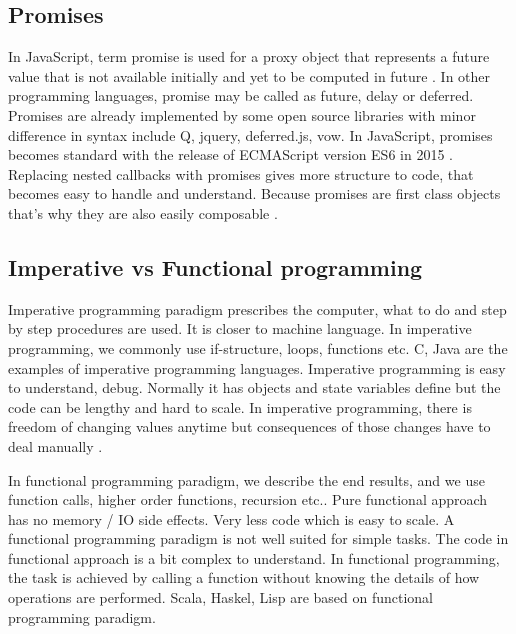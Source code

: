 \subsection{Promises}
In JavaScript, term promise is used for a proxy object that represents a future value that is not available initially and yet to be computed in future \citep{Kambona:2013:ERP:2489798.2489802}.  In other programming languages, promise may be called as future, delay or deferred. Promises are already implemented by some open source libraries with minor difference in syntax include Q, jquery, deferred.js, vow. In JavaScript, promises becomes standard with the release of ECMAScript version ES6 in 2015 \citep{ecmaScriptPromise}.
Replacing nested callbacks with promises gives more structure to code, that becomes easy to handle and understand. Because promises are first class objects that's why they are also easily composable \citep{Kambona:2013:ERP:2489798.2489802}.

\subsection{Imperative vs Functional programming}
Imperative programming paradigm prescribes the computer, what to do and step by step procedures are used. It is closer to machine language. In imperative programming, we commonly use if-structure, loops, functions etc. C, Java are the examples of imperative programming languages. Imperative programming is easy to understand, debug. Normally it has objects and state variables define but the code can be lengthy and hard to scale.
In imperative programming, there is freedom of changing values anytime but consequences of those changes have to deal manually \citep{Edwards:2009:CR:1639950.1640058}.

In functional programming paradigm, we describe the end results, and we use function calls, higher order functions, recursion etc.. Pure functional approach has no memory / IO side effects. Very less code which is easy to scale. A functional programming paradigm is not well suited for simple tasks. The code in functional approach is a bit complex to understand. In functional programming, the task is achieved by calling a function without knowing the details of how operations are performed. Scala, Haskel, Lisp are based on functional programming paradigm.

